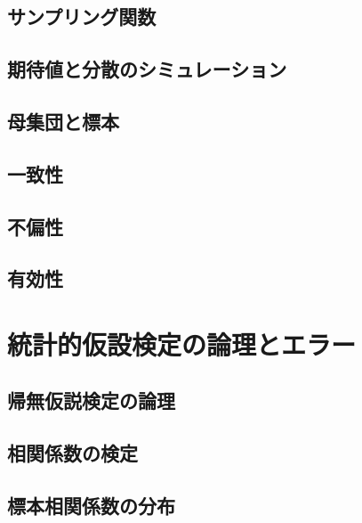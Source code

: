 \documentclass[
  a4paper,
]{ltjsbook}
\begin{document}
\section{サンプリング関数}\label{ux30b5ux30f3ux30d7ux30eaux30f3ux30b0ux95a2ux6570}

\section{期待値と分散のシミュレーション}\label{ux671fux5f85ux5024ux3068ux5206ux6563ux306eux30b7ux30dfux30e5ux30ecux30fcux30b7ux30e7ux30f3}

\section{母集団と標本}\label{ux6bcdux96c6ux56e3ux3068ux6a19ux672c}

\section{一致性}\label{ux4e00ux81f4ux6027}

\section{不偏性}\label{ux4e0dux504fux6027}

\section{有効性}\label{ux6709ux52b9ux6027}


\chapter{統計的仮設検定の論理とエラー}\label{ux7d71ux8a08ux7684ux4eeeux8a2dux691cux5b9aux306eux8ad6ux7406ux3068ux30a8ux30e9ux30fc}

\section{帰無仮説検定の論理}\label{ux5e30ux7121ux4eeeux8aacux691cux5b9aux306eux8ad6ux7406}

\section{相関係数の検定}\label{ux76f8ux95a2ux4fc2ux6570ux306eux691cux5b9a}

\section{標本相関係数の分布}\label{ux6a19ux672cux76f8ux95a2ux4fc2ux6570ux306eux5206ux5e03}
\end{document}
